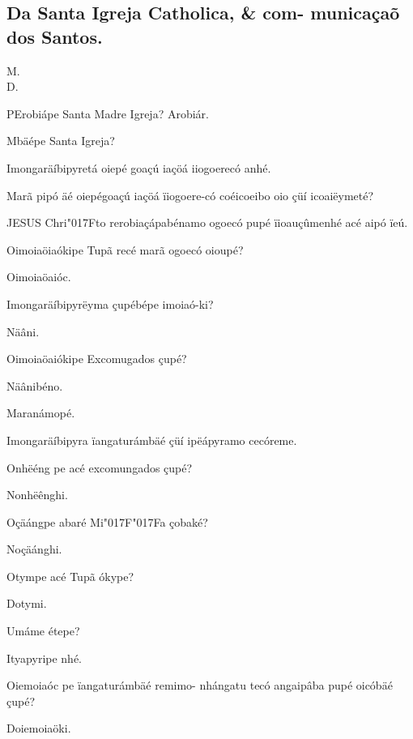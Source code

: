 \documentclass[openany,titlepage,12pt]{book}
\renewcommand{\chaptermark}[1]{\markboth{#1}{}}
\renewcommand{\sectionmark}[1]{\gdef\rightmark{#1}}
\newcommand{\lgS}{\char"017F}
\newcommand{\lgSS}{\char"017F\char"017F}
\newcommand{\comecalista}[5]{
    \hspace*{-11.7pt}
    \begin{minipage}[t]{0.08\linewidth}
        \flushright #1\\#2
    \end{minipage}
    \hspace{0pt}
    \begin{minipage}[t]{0.94\linewidth}
        \lettrine
        [findent =2pt, nindent=0pt,  lines=2]
        {#3}{#4}#5
    \end{minipage}
    \vspace*{-3pt}
}
\begin{document}
\subsection{Da Santa Igreja Catholica, \& com-
municaçaõ dos Santos.}

\chaptermark{Dialogo X.}
\sectionmark{Da Santa Igreja Catholica.}
\vspace*{2pt}

\comecalista{M.}{D.}{P}{E}
    {robiápe Santa Madre Igreja?\linebreak
    Arobiár.}

\begin{alternate}
    \item Mbäépe Santa Igreja?
    \item Imongaräíbipyretá oiepé goaçú iaçöá\linebreak
    iiogoerecó anhé.
    \item Marã pipó äé oiepégoaçú iaçöá ïiogoere-có
    coéicoeibo oio çüí icoaiëymeté?
    \item JESUS Chri\lgS to rerobiaçápabénamo\linebreak
    ogoecó pupé ïioauçûmenhé acé aipó ïeú.
    \item Oimoiaöiaókipe Tupã recé marã ogoecó oioupé?
    \item Oimoiaöaióc.
    \item Imongaräíbipyrëyma çupébépe imoiaó-ki?
    \item Näâni.
    \item Oimoiaöaiókipe Excomugados çupé?
    \item Näânibéno.
    \item Maranámopé.
    \item Imongaräíbipyra ïangaturámbäé çüí\linebreak
    ipëápyramo cecóreme.
    \item Onhëéng pe acé excomungados çupé?
    \item Nonhëênghi.
    \item Oçäángpe abaré Mi\lgSS a çobaké?
    \item Noçäánghi.
    \item Otympe acé Tupã ókype?
    \item Dotymi.
    \item Umáme étepe?
    \item Ityapyripe nhé.
    \item Oiemoiaóc pe ïangaturámbäé remimo-
    nhángatu tecó angaipâba pupé oicóbäé\linebreak
    çupé?
    \item Doiemoiaöki.

\end{alternate}
\end{document}

